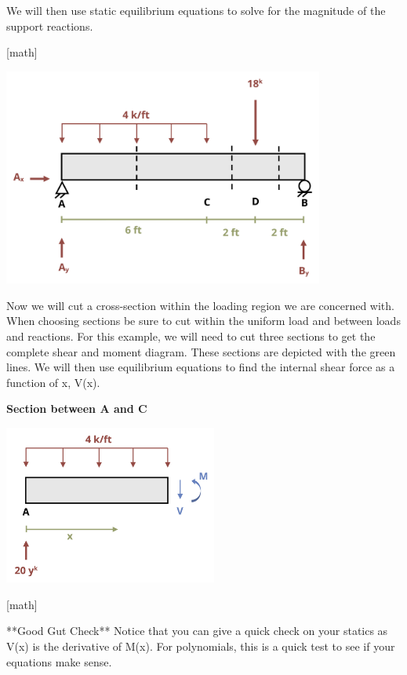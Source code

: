 \documentclass[
  letterpaper,
  DIV=11,
  numbers=noendperiod]{scrreprt}
\begin{document}
\begin{tcolorbox}
We will then use static equilibrium equations to solve for the magnitude
of the support reactions.

{[}math{]}

\begin{center}
\includegraphics[width=4.15625in,height=\textheight]{images/CH7 PNGs/example 7.2 part 3.png}
\end{center}

Now we will cut a cross-section within the loading region we are
concerned with. When choosing sections be sure to cut within the uniform
load and between loads and reactions. For this example, we will need to
cut three sections to get the complete shear and moment diagram. These
sections are depicted with the green lines. We will then use equilibrium
equations to find the internal shear force as a function of x, V(x).

\textbf{Section between A and C}

\begin{center}
\includegraphics[width=2.76042in,height=\textheight]{images/CH7 PNGs/example 7.2 part 4.png}
\end{center}

{[}math{]}

**Good Gut Check** Notice that you can give a quick check on your
statics as V(x) is the derivative of M(x). For polynomials, this is a
quick test to see if your equations make sense.


\end{tcolorbox}
\end{document}
